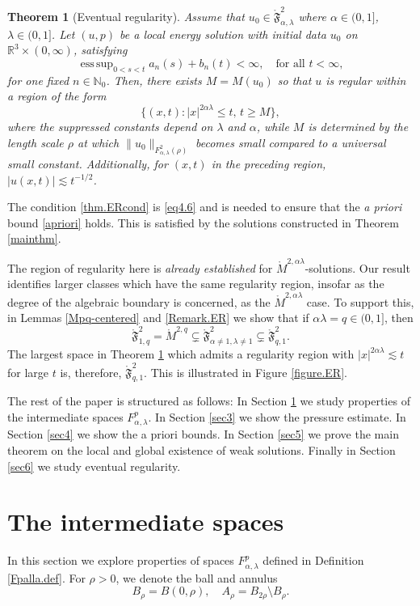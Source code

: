 \documentclass[11pt]{article}
\numberwithin{equation}{section}
\newtheorem{thm}{Theorem}[section]
\theoremstyle{remark}
\theoremstyle{definition}
\newcommand{\R}{\mathbb{R}}
\newcommand\al{\alpha}
\newcommand\la{\lambda}
\newcommand{\NN}{\mathbb{N}}
\newcommand{\esssup} {\mathop{\mathrm{ess\,sup}}}
\newcommand{\I}{\infty}
\newcommand{\EQ}[1]{\begin{equation} #1 \end{equation}}
\begin{document}
\begin{thm}[Eventual regularity]\label{thm.ER}
Assume that $ u_0 \in \mathring {\mathfrak F}^{2}_{\al,\la}$ where   $\al\in (0,1]$, $\la\in (0,1]$.   Let $(u,p)$ be a local energy solution with initial data $u_0$ on $\R^3\times(0,\I)$, satisfying%
%
\EQ{\label{thm.ERcond}
\esssup_{0<s<t}a_n(s)+b_n(t)< \infty, \quad \text{for all } t<\I,
}   for one fixed $n\in\NN_0$.
%
Then, there exists $M = M(u_0)$ so that $u$ is regular within a region of the form
\[
\{ (x,t)  :  |x|^{2 \al \la} \leq t, \, t\geq M \},
\]
where the suppressed constants depend on $\la$ and $\al$,  while $M$ is determined by the length scale $\rho$ at which $\|u_0\|_{F^2_{\al,\la}(\rho)}$ becomes small compared to a universal small constant. {Additionally, for $(x,t)$ in the preceding region, $|u(x,t)|\lesssim t^{-1/2}$.}
\end{thm}

The condition \eqref{thm.ERcond} is \eqref{eq4.6} and is needed to ensure that the \textit{a priori} bound \eqref{apriori} holds. This is satisfied by the solutions constructed in Theorem \ref{mainthm}.

The region of regularity here is \textit{already established} for $\mathring M^{2,\al \la}$-solutions. Our result identifies larger classes which have the same regularity region, insofar as the degree of the algebraic boundary is concerned, as the $\mathring M^{2,\al \la}$ case. To support this, in Lemmas \ref{Mpq-centered} and \ref{Remark.ER} we show that if $\al \la = q\in (0,1]$, then
\[
\mathring {\mathfrak F}^{2}_{1,q} = \mathring M^{2,q }\subsetneq \mathring {\mathfrak F}^{2}_{\al\neq 1,\la\neq 1} \subsetneq \mathring {\mathfrak F}^{2}_{q,1}.
\]
The largest space in Theorem \ref{thm.ER} which admits a regularity region with $ |x|^{2 \al \la} \lesssim t$ for large $t$ is, therefore, $\mathring {\mathfrak F}^{2}_{q,1}$.
This is illustrated in Figure \ref{figure.ER}.



\bigskip
The rest of the paper is structured as follows:
In Section \ref{sec2} we study properties of the intermediate spaces $F^{p}_{\al,\lambda}$.
In Section \ref{sec3} we show the pressure estimate.
In Section \ref{sec4} we show the a priori bounds.
In Section \ref{sec5} we prove the main theorem on the local and global existence of weak solutions.
Finally in Section \ref{sec6} we study eventual regularity.



%
%
\section{The intermediate spaces}\label{sec2}
In this section we explore
properties of spaces $F^{p}_{\al,\lambda}$ defined in Definition \ref{Fpalla.def}.
For $\rho>0$, we denote the ball and annulus
\[
B_\rho=B(0,\rho),\quad
A_\rho = B_{2\rho} \setminus B_\rho.
\]
\end{document}
